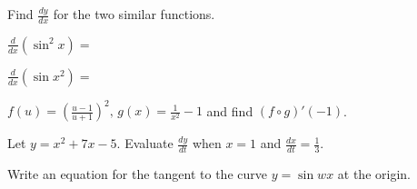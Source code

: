 \documentclass[addpoints, 12pt]{exam}
\begin{document}
\begin{questions}
\begin{parts}
    \end{parts}
    
    \newpage
    
    \question Find $\displaystyle\frac{dy}{dx}$ for the two similar functions.
    \begin{parts}
        \begin{minipage}{.45\linewidth}
            \question $\displaystyle \frac{d}{dx}\left(\sin^2 x\right)=$
        \end{minipage}
        \hfill
        \begin{minipage}{.45\linewidth}
            \question $\displaystyle \frac{d}{dx}\left(\sin x^2\right)=$
        \end{minipage}
    \end{parts}
    
    
    \question $\displaystyle f(u)=\left(\frac{u-1}{u+1}\right)^2,\, g(x)=\frac{1}{x^2}-1$ and find $(f\circ g)'(-1)$.
    
    
    \question Let $y=x^2+7x-5.$ Evaluate $\displaystyle\frac{dy}{dt}$ when $x=1$ and $\displaystyle\frac{dx}{dt}=\frac{1}{3}$.
    
    
    \question Write an equation for the tangent to the curve $y=\sin wx$ at the origin.
    
    
\end{questions}


\newpage
{}
\end{document}
